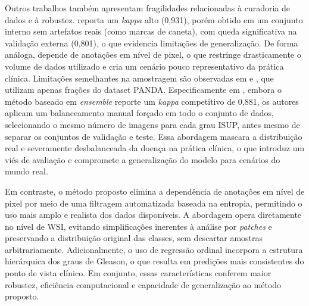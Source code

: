 Outros trabalhos também apresentam fragilidades relacionadas à curadoria de dados e à robustez. \cite{Xiang2023Prostate} reporta um \textit{kappa} alto (0,931), porém obtido em um conjunto interno sem artefatos reais (como marcas de caneta), com queda significativa na validação externa (0,801), o que evidencia limitações de generalização. De forma análoga, \cite{kabir2025automating} depende de anotações em nível de pixel, o que restringe drasticamente o volume de dados utilizado e cria um cenário pouco representativo da prática clínica. Limitações semelhantes na amostragem são observadas em \cite{bhattacharyya2026tsor} e \cite{bhattacharyya2024wsi}, que utilizam apenas frações do dataset PANDA. Especificamente em \cite{bhattacharyya2024wsi}, embora o método baseado em \textit{ensemble} reporte um \textit{kappa} competitivo de 0,881, os autores aplicam um balanceamento manual forçado em todo o conjunto de dados, selecionando o mesmo número de imagens para cada grau ISUP, antes mesmo de separar os conjuntos de validação e teste. Essa abordagem mascara a distribuição real e severamente desbalanceada da doença na prática clínica, o que introduz um viés de avaliação e compromete a generalização do modelo para cenários do mundo real.

Em contraste, o método proposto elimina a dependência de anotações em nível de pixel por meio de uma filtragem automatizada baseada na entropia, permitindo o uso mais amplo e realista dos dados disponíveis. A abordagem opera diretamente no nível de WSI, evitando simplificações inerentes à análise por \textit{patches} e preservando a distribuição original das classes, sem descartar amostras arbitrariamente. Adicionalmente, o uso de regressão ordinal incorpora a estrutura hierárquica dos graus de Gleason, o que resulta em predições mais consistentes do ponto de vista clínico. Em conjunto, essas características conferem maior robustez, eficiência computacional e capacidade de generalização ao método proposto.

